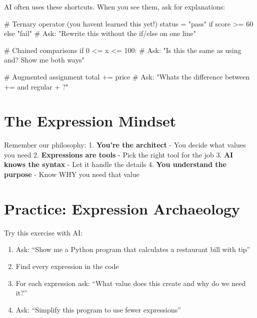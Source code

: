 \documentclass[
  letterpaper,
  DIV=11,
  numbers=noendperiod,
  oneside]{scrreprt}
\newenvironment{Shaded}{}{}
\newcommand{\CommentTok}[1]{\textcolor[rgb]{0.42,0.45,0.49}{#1}}
\newcommand{\ControlFlowTok}[1]{\textcolor[rgb]{0.84,0.23,0.29}{#1}}
\newcommand{\DecValTok}[1]{\textcolor[rgb]{0.00,0.36,0.77}{#1}}
\newcommand{\NormalTok}[1]{\textcolor[rgb]{0.14,0.16,0.18}{#1}}
\newcommand{\OperatorTok}[1]{\textcolor[rgb]{0.14,0.16,0.18}{#1}}
\newcommand{\StringTok}[1]{\textcolor[rgb]{0.01,0.18,0.38}{#1}}
\providecommand{\tightlist}{%
  \setlength{\itemsep}{0pt}\setlength{\parskip}{0pt}}\usepackage{longtable,booktabs,array}
\begin{document}
AI often uses these shortcuts. When you see them, ask for explanations:

\begin{Shaded}
\begin{Highlighting}[]
\CommentTok{\# Ternary operator (you haven\textquotesingle{}t learned this yet!)}
\NormalTok{status }\OperatorTok{=} \StringTok{"pass"} \ControlFlowTok{if}\NormalTok{ score }\OperatorTok{\textgreater{}=} \DecValTok{60} \ControlFlowTok{else} \StringTok{"fail"}
\CommentTok{\# Ask: "Rewrite this without the if/else on one line"}

\CommentTok{\# Chained comparisons  }
\ControlFlowTok{if} \DecValTok{0} \OperatorTok{\textless{}=}\NormalTok{ x }\OperatorTok{\textless{}=} \DecValTok{100}\NormalTok{:}
\CommentTok{\# Ask: "Is this the same as using \textquotesingle{}and\textquotesingle{}? Show me both ways"}

\CommentTok{\# Augmented assignment}
\NormalTok{total }\OperatorTok{+=}\NormalTok{ price}
\CommentTok{\# Ask: "What\textquotesingle{}s the difference between += and regular + ?"}
\end{Highlighting}
\end{Shaded}

\section{The Expression Mindset}\label{the-expression-mindset}

Remember our philosophy: 1. \textbf{You're the architect} - You decide
what values you need 2. \textbf{Expressions are tools} - Pick the right
tool for the job 3. \textbf{AI knows the syntax} - Let it handle the
details 4. \textbf{You understand the purpose} - Know WHY you need that
value

\section{Practice: Expression
Archaeology}\label{practice-expression-archaeology}

Try this exercise with AI:

\begin{enumerate}
\def\labelenumi{\arabic{enumi}.}
\tightlist
\item
  Ask: ``Show me a Python program that calculates a restaurant bill with
  tip''
\item
  Find every expression in the code
\item
  For each expression ask: ``What value does this create and why do we
  need it?''
\item
  Ask: ``Simplify this program to use fewer expressions''
\end{enumerate}
\end{document}
